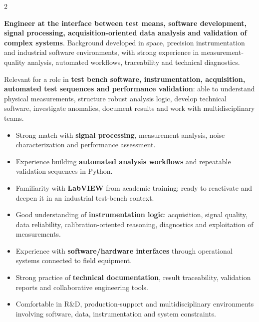 \documentclass[8pt,a4paper,ragged2e,withhyper]{altacv}
\begin{document}
\begin{paracol}{2}
\switchcolumn


\textbf{Engineer at the interface between test means, software development, signal processing, acquisition-oriented data analysis and validation of complex systems}. Background developed in space, precision instrumentation and industrial software environments, with strong experience in measurement-quality analysis, automated workflows, traceability and technical diagnostics.

Relevant for a role in \textbf{test bench software, instrumentation, acquisition, automated test sequences and performance validation}: able to understand physical measurements, structure robust analysis logic, develop technical software, investigate anomalies, document results and work with multidisciplinary teams.


\begin{itemize}
  \item Strong match with \textbf{signal processing}, measurement analysis, noise characterization and performance assessment.
  \item Experience building \textbf{automated analysis workflows} and repeatable validation sequences in Python.
  \item Familiarity with \textbf{LabVIEW} from academic training; ready to reactivate and deepen it in an industrial test-bench context.
  \item Good understanding of \textbf{instrumentation logic}: acquisition, signal quality, data reliability, calibration-oriented reasoning, diagnostics and exploitation of measurements.
  \item Experience with \textbf{software/hardware interfaces} through operational systems connected to field equipment.
  \item Strong practice of \textbf{technical documentation}, result traceability, validation reports and collaborative engineering tools.
  \item Comfortable in R\&D, production-support and multidisciplinary environments involving software, data, instrumentation and system constraints.
\end{itemize}




\end{paracol}
\end{document}
